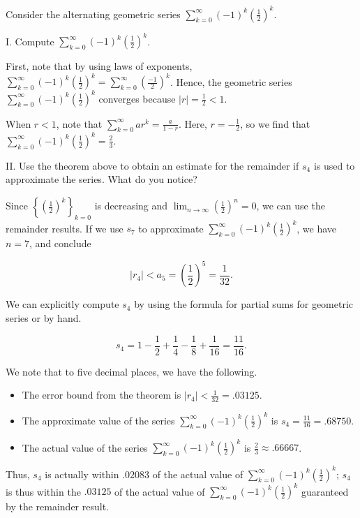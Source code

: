 \documentclass{ximera}
\begin{document}
\begin{example}
Consider the alternating geometric series $\sum_{k=0}^{\infty} (-1)^k \left(\frac{1}{2}\right)^k$.

I. Compute $\sum_{k=0}^{\infty} (-1)^k \left(\frac{1}{2}\right)^k$.

\begin{explanation}
First, note that by using laws of exponents, $\sum_{k=0}^{\infty} (-1)^k \left(\frac{1}{2}\right)^k = \sum_{k=0}^{\infty}  \left(\frac{-1}{2}\right)^k$.   
Hence, the geometric series $\sum_{k=0}^{\infty} (-1)^k \left(\frac{1}{2}\right)^k$ converges because $|r| = \frac{1}{2} <1$.


When $r<1$, note that $\sum_{k=0}^{\infty} ar^k = \frac{a}{1-r}$.  Here, $r= -\frac{1}{2}$, so we find that $\sum_{k=0}^{\infty} (-1)^k \left(\frac{1}{2}\right)^k= \frac{2}{3}.$
\end{explanation}

II. Use the theorem above to obtain an estimate for the remainder if $s_4$ is used to approximate the series.  What do you notice?

\begin{explanation}
Since $\left\{\left(\frac{1}{2}\right)^k\right\}_{k=0}$ is decreasing and $\lim_{n \to \infty} \left(\frac{1}{2}\right)^n =0$, we can use the remainder results.  If we use $s_7$ to approximate  $\sum_{k=0}^{\infty} (-1)^k \left(\frac{1}{2}\right)^k$, we have $n=7$, and conclude

\[
|r_4| < a_5 = \left(\frac{1}{2}\right)^5 = \frac{1}{32}.
\]

We can explicitly compute $s_4$ by using the formula for partial sums for geometric series or by hand.

\[
s_4 = 1-\frac{1}{2}+\frac{1}{4}-\frac{1}{8}+\frac{1}{16} = \frac{11}{16}.
\]

We note that to five decimal places, we have the following.

\begin{itemize}
\item The error bound from the theorem is $|r_4| < \frac{1}{32} = .03125$.
\item The approximate value of the series $\sum_{k=0}^{\infty} (-1)^k \left(\frac{1}{2}\right)^k$ is $s_4 = \frac{11}{16} = .68750$.
\item The actual value of the series $\sum_{k=0}^{\infty} (-1)^k \left(\frac{1}{2}\right)^k$ is $\frac{2}{3} \approx .66667$.
\end{itemize}

Thus, $s_4$ is actually within $.02083$ of the actual value of $\sum_{k=0}^{\infty} (-1)^k \left(\frac{1}{2}\right)^k$; $s_4$ is thus within the $.03125$ of the actual value of $\sum_{k=0}^{\infty} (-1)^k \left(\frac{1}{2}\right)^k$ guaranteed by the remainder result.

\end{explanation}
\end{example}
\end{document}
